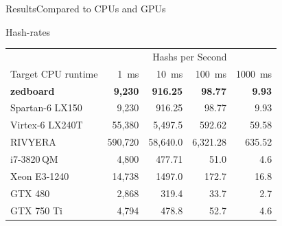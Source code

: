 \begin{frame}{Results}{Compared to CPUs and GPUs}
\begin{block}{Hash-rates }
\begin{table}[tp]
  \centering
  \begin{tabular}{l r r r r}
    \toprule
                        & \multicolumn{4}{c}{\small Hashs per Second}\\
    Target CPU runtime  & \SI{1}{\milli\second} & \SI{10}{\milli\second} & \SI{100}{\milli\second} & \SI{1000}{\milli\second} \\
    \midrule
    {\bf zedboard} & {\bf 9,230} & {\bf 916.25} & {\bf 98.77} & {\bf 9.93} \\
    Spartan-6 LX150& {9,230}     & {916.25}     & {98.77}     & {9.93}     \\
    Virtex-6 LX240T& 55,380      & 5,497.5      & 592.62      & 59.58      \\
    RIVYERA        & 590,720     & 58,640.0     & 6,321.28    & 635.52     \\
    \midrule
    i7-3820\,QM    &   4,800 &  477.71 &  51.0 &  4.6      \\
    Xeon E3-1240   &  14,738 & 1497.0 & 172.7 & 16.8      \\
    \midrule
    GTX 480    &  2,868 & 319.4 & 33.7 & 2.7 \\
    GTX 750 Ti &  4,794 & 478.8 & 52.7 & 4.6 \\
    \bottomrule
  \end{tabular}
\end{table}
\end{block}
\end{frame}

